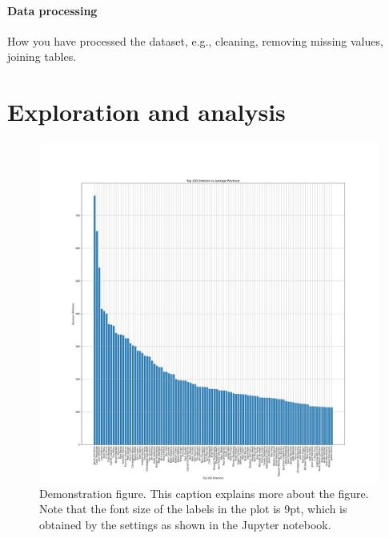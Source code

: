 \documentclass[11pt,a4paper]{article}
\begin{document}
        \paragraph{Data processing}
            How you have processed the dataset, e.g., cleaning, removing missing values,
                joining tables.

    \section{Exploration and  analysis}

        \begin{figure}[t]
            \centering
            \includegraphics{Directors vs Average Revenue.png}
            \caption{Demonstration figure.
                This caption explains more about the figure.
                Note that the font size of the labels in the plot is 9pt, which is obtained by
                    the settings as shown in the Jupyter notebook.
            }
            \label{fds-project-template:fig:example1}
        \end{figure}
\end{document}
